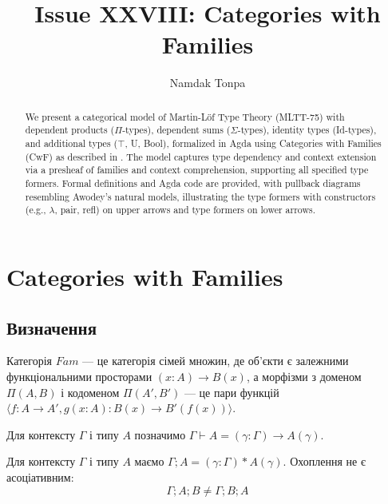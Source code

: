 \documentclass{article}
\begin{document}
\title{Issue XXVIII: Categories with Families}
\author{Namdak Tonpa}
\date{}

\maketitle

\begin{abstract}
We present a categorical model of Martin-Löf Type Theory (MLTT-75) with dependent products ($\Pi$-types), dependent sums ($\Sigma$-types), identity types (Id-types), and additional types ($\top$, U, Bool), formalized in Agda using Categories with Families (CwF) as described in \cite{awodey2019}. The model captures type dependency and context extension via a presheaf of families and context comprehension, supporting all specified type formers. Formal definitions and Agda code are provided, with pullback diagrams resembling Awodey’s natural models, illustrating the type formers with constructors (e.g., $\lambda$, pair, refl) on upper arrows and type formers on lower arrows.
\end{abstract}

\section{Categories with Families}

\subsection{Визначення}

\begin{definition}[Fam]
Категорія $Fam$ --- це категорія сімей множин, де об’єкти є залежними функціональними просторами $(x:A)\rightarrow B(x)$, а морфізми з доменом $\Pi(A,B)$ і кодоменом $\Pi(A',B')$ --- це пари функцій $\langle f:A\rightarrow A', g(x:A):B(x)\rightarrow B'(f(x)) \rangle$.
\end{definition}

\begin{definition}[$\Pi$-похідність]
Для контексту $\Gamma$ і типу $A$ позначимо $\Gamma\vdash A = (\gamma:\Gamma)\rightarrow A(\gamma)$.
\end{definition}

\begin{definition}
Для контексту $\Gamma$ і типу $A$ маємо $\Gamma;A = (\gamma:\Gamma)*A(\gamma)$. Охоплення не є асоціативним:
\[
    \Gamma;A;B \neq \Gamma;B;A
\]
\end{definition}
\end{document}
